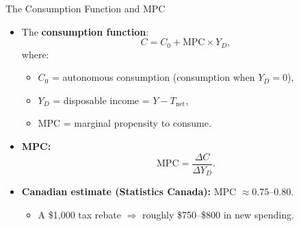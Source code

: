 \documentclass[aspectratio=169]{beamer}
\begin{document}
\begin{frame}{The Consumption Function and MPC}
\transfade
\begin{itemize}[<+->]
  \item The \textbf{consumption function}:
  \[
    C = C_0 + \text{MPC} \times Y_D,
  \]
  where:
  \begin{itemize}[<+->]
    \item $C_0$ = autonomous consumption (consumption when $Y_D = 0$),
    \item $Y_D$ = disposable income = $Y - T_{\text{net}}$,
    \item $\text{MPC}$ = marginal propensity to consume.
  \end{itemize}
  \item \textbf{MPC:}
  \[
    \text{MPC} = \frac{\Delta C}{\Delta Y_D}.
  \]
  \item \textbf{Canadian estimate (Statistics Canada):} MPC $\approx 0.75$--$0.80$.
  \begin{itemize}[<+->]
    \item A \$1{,}000 tax rebate $\Rightarrow$ roughly \alert{\$750--\$800} in new spending.
  \end{itemize}
\end{itemize}
\end{frame}
\end{document}
